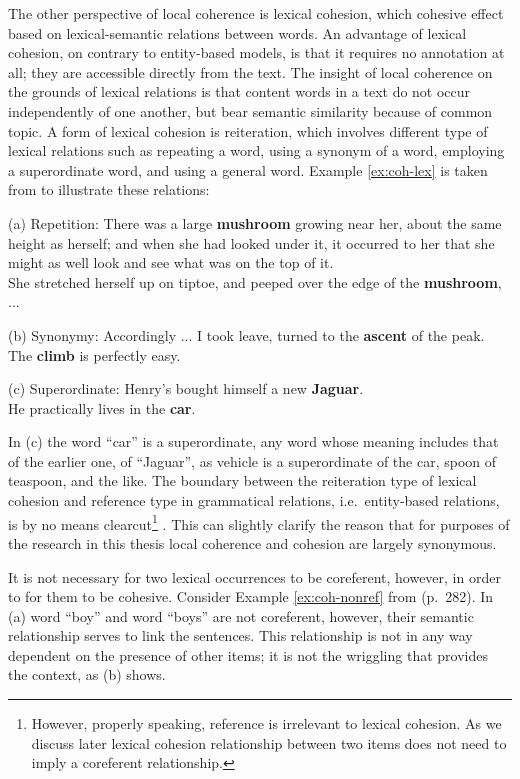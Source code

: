 The other perspective of local coherence is lexical cohesion, which cohesive effect based on lexical-semantic relations between words. 
An advantage of lexical cohesion, on contrary to entity-based models, is that it requires no annotation at all; they are accessible directly from the text. 
The insight of local coherence on the grounds of lexical relations is that content words in a text do not occur independently of one another, but bear semantic similarity because of common topic. 
A form of lexical cohesion is reiteration, which involves different type of lexical relations such as repeating a word, using a synonym of a word, employing a superordinate word, and using a general word. 
Example \ref{ex:coh-lex} is taken from \cite{halliday78} to illustrate these relations:

\begin{examples}
	\label{ex:coh-lex}
	(a) Repetition: There was a large \textbf{mushroom} growing near her, about the same height as herself; and when she had looked under it, it occurred to her that she might as well look and see what was on the top of it.\\
	She stretched herself up on tiptoe, and peeped over the edge of the \textbf{mushroom}, ... 

	(b) Synonymy: Accordingly ... I took leave, turned to the \textbf{ascent} of the peak. \\
	The \textbf{climb} is perfectly easy. 

	(c) Superordinate: Henry's bought himself a new \textbf{Jaguar}. \\
	He practically lives in the \textbf{car}. 

\end{examples} 

In (c) the word ``car'' is a superordinate, any word whose meaning includes that of the earlier one, of ``Jaguar'', as vehicle is a superordinate of the car, spoon of teaspoon, and the like. 
The boundary between the reiteration type of lexical cohesion and reference type in grammatical relations, i.e.\ entity-based relations, is by no means clearcut\footnote{However, properly speaking, reference is irrelevant to lexical cohesion. As we discuss later lexical cohesion relationship between two items does not need to imply a coreferent relationship.} \cite{halliday78}. 
This can slightly clarify the reason that for purposes of the research in this thesis local coherence and cohesion are largely synonymous.

It is not necessary for two lexical occurrences to be coreferent, however, in order to for them to be cohesive. 
Consider Example \ref{ex:coh-nonref} from (p.~282). 
In (a) word ``boy'' and  word ``boys'' are not coreferent, however, their semantic relationship serves to link the sentences. 
This relationship is not in any way dependent on the presence of other items; it is not the wriggling that provides the context, as (b) shows. 

